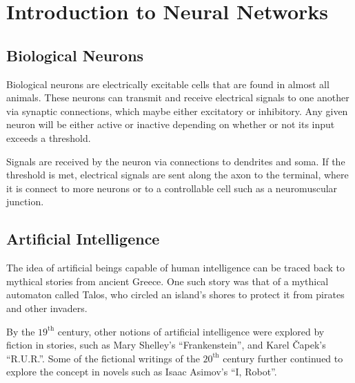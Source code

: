 \chapter{Introduction to Neural Networks}


\section{Biological Neurons}

Biological neurons are electrically excitable cells that are found in almost all
animals.
These neurons can transmit and receive electrical signals to one another via
synaptic connections, which maybe either excitatory or inhibitory.
Any given neuron will be either active or inactive depending on whether or not
its input exceeds a threshold.

\begin{center}
    \vspace{1ex}
    
\end{center}

Signals are received by the neuron via connections to dendrites and soma.
If the threshold is met, electrical signals are sent along the axon to the
terminal, where it is connect to more neurons or to a controllable cell such as
a neuromuscular junction.


\section{Artificial Intelligence}

The idea of artificial beings capable of human intelligence can be traced back
to mythical stories from ancient Greece.
One such story was that of a mythical automaton called Talos, who circled an
island's shores to protect it from pirates and other invaders.

By the $19^\text{th}$ century, other notions of artificial intelligence were
explored by fiction in stories, such as Mary Shelley's ``Frankenstein'', and
Karel \v{C}apek's ``R.U.R.''.
Some of the fictional writings of the $20^\text{th}$ century further continued
to explore the concept in novels such as Isaac Asimov's ``I, Robot''.

